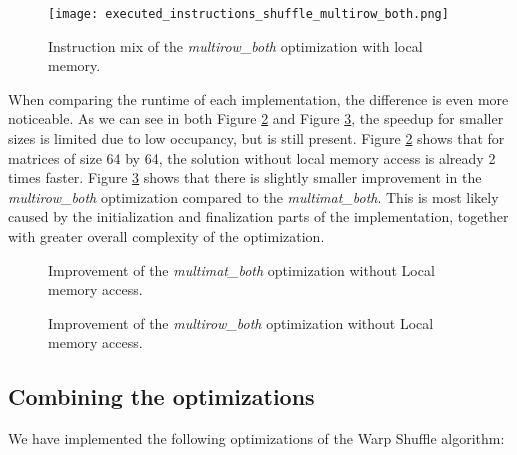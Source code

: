 \begin{figure}[ht]
	\centering
	\texttt{[image: executed\_instructions\_shuffle\_multirow\_both.png]}
	\caption{Instruction mix of the \textit{multirow\_both} optimization with local memory.}
	\label{fig:shuffle_multirow_both_instruction_mix}
\end{figure}



When comparing the runtime of each implementation, the difference is even more noticeable. As we can see in both Figure \ref{fig:multimat_both_speedup} and Figure \ref{fig:multirow_both_speedup}, the speedup for smaller sizes is limited due to low occupancy, but is still present. Figure \ref{fig:multimat_both_speedup} shows that for matrices of size 64 by 64, the solution without local memory access is already 2 times faster. 
Figure \ref{fig:multirow_both_speedup} shows that there is slightly smaller improvement in the \textit{multirow\_both} optimization compared to the \textit{multimat\_both}. This is most likely caused by the initialization and finalization parts of the implementation, together with greater overall complexity of the optimization.
\begin{figure}[ht]
	\centering
	\def\svgwidth{0.5\textwidth}
	
	\caption{Improvement of the \textit{multimat\_both} optimization without Local memory access.}
	\label{fig:multimat_both_speedup}
\end{figure}

\begin{figure}[ht]
	\centering
	\def\svgwidth{0.5\textwidth}
	
	\caption{Improvement of the \textit{multirow\_both} optimization without Local memory access.}
	\label{fig:multirow_both_speedup}
\end{figure}


\subsection{Combining the optimizations}
\label{sec:combining_optimizations}

We have implemented the following optimizations of the Warp Shuffle algorithm:


